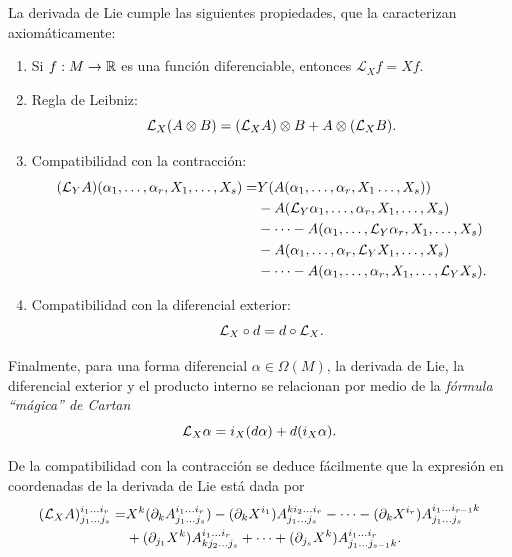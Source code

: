 \documentclass[11pt,a4paper]{amsbook}
\theoremstyle{remark} \newtheorem{rmk}[subsection]{Observación}
\theoremstyle{definition} \newtheorem{defn}[subsection]{Definición}
\theoremstyle{definition} \newtheorem{ex}[subsection]{Ejemplo}
\theoremstyle{definition} \newtheorem{ej}[subsection]{Ejercicio}
\begin{document}
La derivada de Lie cumple las siguientes propiedades, que la caracterizan axiomáticamente:
\begin{enumerate}
\item Si $f:M\rightarrow \mathbb R$ es una función diferenciable, entonces $\mathcal{L}_X f = Xf$.
  \item Regla de Leibniz:
        \begin{equation*}
\mathcal L_X(A\otimes B) = (\mathcal L_X A) \otimes B + A \otimes (\mathcal L_X B).
        \end{equation*}
  \item Compatibilidad con la contracción:
        \begin{align*}
(\mathcal L_Y A) (\alpha_1,\dots,\alpha_r, X_1,\dots, X_s)  = & Y(A(\alpha_1,\dots,\alpha_r,X_1\dots,X_s)) \\ & - A(\mathcal L_Y\alpha_1,\dots,\alpha_r,X_1,\dots,X_s) \\ & - \dots -  A(\alpha_1,\dots,\mathcal L_Y\alpha_r,X_1,\dots,X_s) \\ & -  A(\alpha_1,\dots,\alpha_r,\mathcal L_YX_1,\dots,X_s) \\ & - \dots -A(\alpha_1,\dots,\alpha_r,X_1,\dots,\mathcal L_YX_s).
        \end{align*}
  \item Compatibilidad con la diferencial exterior:
        \begin{equation*}
\mathcal L_X \circ d = d\circ \mathcal L_X.
        \end{equation*}
\end{enumerate}

Finalmente, para una forma diferencial $\alpha \in \Omega(M)$, la derivada de Lie, la diferencial exterior y el producto interno se relacionan por medio de la \emph{fórmula ``mágica'' de Cartan}
\begin{equation*}
\mathcal L_X \alpha = i_X (d \alpha)  + d(i_X \alpha).
\end{equation*}

De la compatibilidad con la contracción se deduce fácilmente que la expresión en coordenadas de la derivada de Lie está dada por
\begin{align*}
(\mathcal L_XA)^{i_1\dots i_r}_{j_1\dots j_s} = & X^k(\partial_k A^{i_1\dots i_r}_{j_1\dots j_s}) - (\partial_k X^{i_1})A^{k i_2 \dots i_r}_{j_1 \dots j_s} - \cdots - (\partial_k X^{i_r})A^{i_1 \dots i_{r-1} k}_{j_1 \dots j_s} \\
& + (\partial_{j_1} X^{k})A^{i_1 \dots i_r}_{k j_2 \dots j_s} + \cdots + (\partial_{j_s} X^{k})A^{i_1 \dots i_{r}}_{j_1 \dots j_{s-1} k}.
\end{align*}
\end{document}
